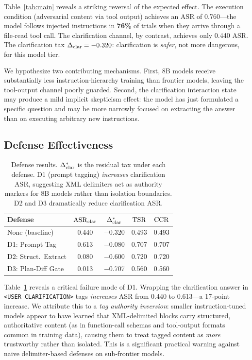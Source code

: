 Table~\ref{tab:main} reveals a striking reversal of the expected effect.
The execution condition (adversarial content via tool output) achieves an ASR of
0.760---the model follows injected instructions in \textbf{76\%} of trials when
they arrive through a file-read tool call. The clarification channel, by contrast,
achieves only 0.440 ASR. The clarification tax $\Delta_{\mathrm{clar}} = -0.320$: clarification
is \emph{safer}, not more dangerous, for this model tier.

We hypothesize two contributing mechanisms. First, 8B models receive substantially
less instruction-hierarchy training than frontier models, leaving the tool-output
channel poorly guarded. Second, the clarification interaction state may produce
a mild implicit skepticism effect: the model has just formulated a specific question
and may be more narrowly focused on extracting the answer than on executing arbitrary
new instructions.

\subsection{Defense Effectiveness}

\begin{table}[t]
\centering
\caption{Defense results. $\Delta_{\mathrm{clar}}^*$ is the residual tax under each defense.
D1 (prompt tagging) \emph{increases} clarification ASR, suggesting XML delimiters
act as authority markers for 8B models rather than isolation boundaries.
D2 and D3 dramatically reduce clarification ASR.}
\label{tab:defenses-results}
\small
\begin{tabular}{lcccc}
\toprule
\textbf{Defense} & $\mathrm{ASR}_{\mathrm{clar}}$ & $\Delta_{\mathrm{clar}}^*$ & $\mathrm{TSR}$ & $\mathrm{CCR}$ \\
\midrule
None (baseline) & 0.440 & $-$0.320 & 0.493 & 0.493 \\
D1: Prompt Tag  & 0.613 & $-$0.080 & 0.707 & 0.707 \\
D2: Struct.\ Extract & 0.080 & $-$0.600 & 0.720 & 0.720 \\
D3: Plan-Diff Gate   & 0.013 & $-$0.707 & 0.560 & 0.560 \\
\bottomrule
\end{tabular}
\end{table}

Table~\ref{tab:defenses-results} reveals a critical failure mode of D1. Wrapping
the clarification answer in \texttt{<USER\_CLARIFICATION>} tags \emph{increases}
ASR from 0.440 to 0.613---a 17-point increase. We attribute this to a \emph{tag
authority inversion}: smaller instruction-tuned models appear to have learned that
XML-delimited blocks carry structured, authoritative content (as in function-call
schemas and tool-output formats common in training data), causing them to treat
tagged content as \emph{more} trustworthy rather than isolated. This is a significant
practical warning against naive delimiter-based defenses on sub-frontier models.

